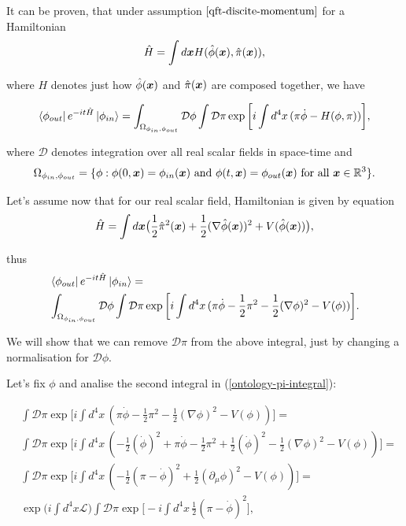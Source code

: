 \documentclass[main.tex]{subfiles}
\begin{document}
It can be proven, that under assumption $\ref{qft-discite-momentum}$ for a Hamiltonian
\begin{equation}
\hat{H} = \int d\boldsymbol{x} H(\hat{\phi}(\boldsymbol{x}), \hat{\pi}(\boldsymbol{x})),  
\end{equation}

where $H$ denotes just how $\hat{\phi}(\boldsymbol{x})$ and $\hat{\pi}(\boldsymbol{x})$ are composed together, we have

\begin{equation}
\bra{\phi_{out}} e^{-it\hat{H}} \ket{\phi_{in}} = \int_{\Omega_{\phi_{in}, \phi_{out}}} \mathcal{D}\phi  \int \mathcal{D}\pi
\exp\bigg[i \int d^4 x\, (\pi\dot{\phi} - H(\phi, \pi)) \bigg],
\end{equation}

where $\mathcal{D}$ denotes integration over all real scalar fields in space-time and
\begin{equation}
\Omega_{\phi_{in}, \phi_{out}} = 
\{\phi : \phi(0,\boldsymbol{x}) = \phi_{in}(\boldsymbol{x}) \text{ and } \phi(t,\boldsymbol{x}) = \phi_{out}(\boldsymbol{x}) \text{ for all } \boldsymbol{x}\in \mathbb{R}^3 \}.
\end{equation}

Let's assume now that for our real scalar field, Hamiltonian is given by equation
\begin{equation}
\hat{H} = \int d\boldsymbol{x} \big( \frac{1}{2}\hat{\pi}^2 (\boldsymbol{x}) + \frac{1}{2}(\nabla \hat{\phi}(\boldsymbol{x}))^2 + V(\hat{\phi}(\boldsymbol{x}))\big),
\end{equation}

thus
\begin{align}
& \bra{\phi_{out}} e^{-it\hat{H}} \ket{\phi_{in}} = \\
\label{ontology-pi-integral}
& \int_{\Omega_{\phi_{in}, \phi_{out}}} \mathcal{D}\phi  \int \mathcal{D}\pi
\exp\bigg[i \int d^4 x\, (\pi\dot{\phi} - \frac{1}{2}\pi^2 - \frac{1}{2}(\nabla\phi)^2 - V(\phi)) \bigg].
\end{align}

We will show that we can remove $\mathcal{D}\pi$ from the above integral, just by changing a normalisation for $\mathcal{D}\phi$.

Let's fix $\phi$ and analise the second integral in (\ref{ontology-pi-integral}):

\begin{align*}
& \int \mathcal{D}\pi
\exp\bigg[i \int d^4 x\, (\pi\dot{\phi} - \frac{1}{2}\pi^2 - \frac{1}{2}(\nabla\phi)^2 - V(\phi)) \bigg] = \\
& \int \mathcal{D}\pi
\exp\bigg[i \int d^4 x\, (-\frac{1}{2}(\dot{\phi})^2 + \pi\dot{\phi} - \frac{1}{2}\pi^2  + \frac{1}{2} (\dot{\phi})^2 - \frac{1}{2}(\nabla\phi)^2 - V(\phi)) \bigg] = \\
& \int \mathcal{D}\pi
\exp\bigg[i \int d^4 x\, (-\frac{1}{2}(\pi - \dot{\phi})^2 + \frac{1}{2}(\partial_\mu \phi)^2 - V(\phi)) \bigg] = \\
& \exp\bigg(i\int d^4 x \mathcal{L}\bigg)\int \mathcal{D}\pi
\exp\bigg[-i \int d^4 x\, \frac{1}{2}(\pi - \dot{\phi})^2 \bigg], 
\end{align*}
\end{document}

